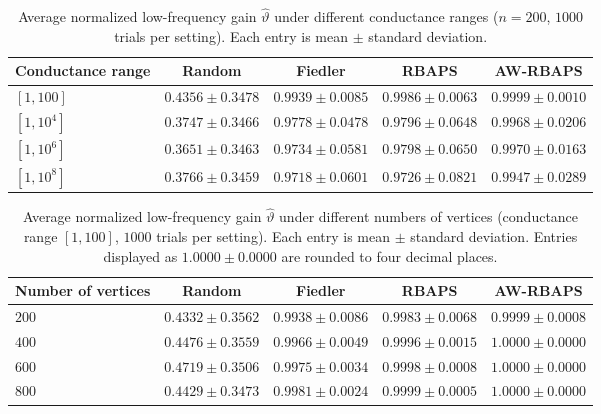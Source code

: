 \documentclass[11pt]{article}
\numberwithin{equation}{section}
\theoremstyle{definition}
\theoremstyle{remark}
\begin{document}
\begin{table}[!t]
	\centering
	\caption{Average normalized low-frequency gain $\widehat\vartheta$ under
		different conductance ranges ($n=200$, $1000$ trials per setting). Each
		entry is mean $\pm$ standard deviation.}
	\label{tab:weight_range}
	\renewcommand{\arraystretch}{1.05}
	\begin{tabular}{lcccc}
		\hline
		Conductance range & Random & Fiedler & RBAPS & AW-RBAPS \\
		\hline
		$[1,100]$      & $0.4356 \pm 0.3478$ & $0.9939 \pm 0.0085$ & $0.9986 \pm 0.0063$ & $\mathbf{0.9999 \pm 0.0010}$ \\
		$[1,10^4]$     & $0.3747 \pm 0.3466$ & $0.9778 \pm 0.0478$ & $0.9796 \pm 0.0648$ & $\mathbf{0.9968 \pm 0.0206}$ \\
		$[1,10^6]$     & $0.3651 \pm 0.3463$ & $0.9734 \pm 0.0581$ & $0.9798 \pm 0.0650$ & $\mathbf{0.9970 \pm 0.0163}$ \\
		$[1,10^8]$     & $0.3766 \pm 0.3459$ & $0.9718 \pm 0.0601$ & $0.9726 \pm 0.0821$ & $\mathbf{0.9947 \pm 0.0289}$ \\
		\hline
	\end{tabular}
\end{table}

\begin{table}[!t]
	\centering
	\caption{Average normalized low-frequency gain $\widehat\vartheta$ under
		different numbers of vertices (conductance range $[1,100]$, $1000$
		trials per setting). Each entry is mean $\pm$ standard deviation. Entries
		displayed as $1.0000\pm0.0000$ are rounded to four decimal places.}
	\label{tab:n_vertices}
	\renewcommand{\arraystretch}{1.05}
	\begin{tabular}{lcccc}
		\hline
		Number of vertices & Random & Fiedler & RBAPS & AW-RBAPS \\
		\hline
		$200$ & $0.4332 \pm 0.3562$ & $0.9938 \pm 0.0086$ & $0.9983 \pm 0.0068$ & $\mathbf{0.9999 \pm 0.0008}$ \\
		$400$ & $0.4476 \pm 0.3559$ & $0.9966 \pm 0.0049$ & $0.9996 \pm 0.0015$ & $\mathbf{1.0000 \pm 0.0000}$ \\
		$600$ & $0.4719 \pm 0.3506$ & $0.9975 \pm 0.0034$ & $0.9998 \pm 0.0008$ & $\mathbf{1.0000 \pm 0.0000}$ \\
		$800$ & $0.4429 \pm 0.3473$ & $0.9981 \pm 0.0024$ & $0.9999 \pm 0.0005$ & $\mathbf{1.0000 \pm 0.0000}$ \\
		\hline
	\end{tabular}
\end{table}
\end{document}
